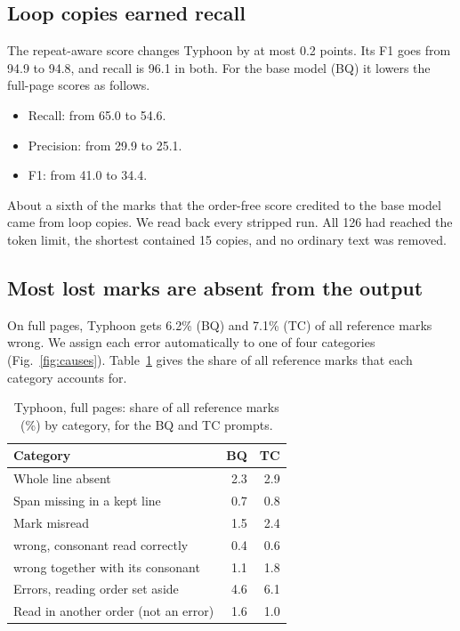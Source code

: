 \subsection{Loop copies earned recall}
The repeat-aware score changes Typhoon by at most 0.2 points. Its F1 goes from 94.9 to 94.8, and recall is 96.1 in both. For the base model (BQ) it lowers the full-page scores as follows.
\begin{itemize}
\item Recall: from 65.0 to 54.6.
\item Precision: from 29.9 to 25.1.
\item F1: from 41.0 to 34.4.
\end{itemize}
About a sixth of the marks that the order-free score credited to the base model came from loop copies. We read back every stripped run. All 126 had reached the token limit, the shortest contained 15 copies, and no ordinary text was removed.

\subsection{Most lost marks are absent from the output}
On full pages, Typhoon gets 6.2\% (BQ) and 7.1\% (TC) of all reference marks wrong. We assign each error automatically to one of four categories (Fig.~\ref{fig:causes}). Table~\ref{tab:causes} gives the share of all reference marks that each category accounts for.

\begin{table}[t]
\caption{Typhoon, full pages: share of all reference marks (\%) by category, for the BQ and TC prompts.}\label{tab:causes}
\centering\footnotesize
\begin{tabular}{@{}l rr@{}}
\toprule
Category & BQ & TC\\
\midrule
Whole line absent & 2.3 & 2.9\\
Span missing in a kept line & 0.7 & 0.8\\
Mark misread & 1.5 & 2.4\\
\quad wrong, consonant read correctly & 0.4 & 0.6\\
\quad wrong together with its consonant & 1.1 & 1.8\\
\midrule
Errors, reading order set aside & 4.6 & 6.1\\
Read in another order (not an error) & 1.6 & 1.0\\
\bottomrule
\end{tabular}
\end{table}

